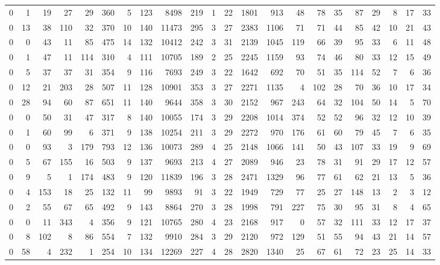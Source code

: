 {\begin{landscape}
\begin{longtable}[c]{lrrrrrrrrrrrrrrrrrrrrr}
0 & 1 & 19 & 27 & 29 & 360 & 5 & 123 & 8498 & 219 & 1 & 22 & 1801 & 913 & 48 & 78 & 35 & 87 & 29 & 8 & 17 & 33 \\
0 & 13 & 38 & 110 & 32 & 370 & 10 & 140 & 11473 & 295 & 3 & 27 & 2383 & 1106 & 71 & 71 & 44 & 85 & 42 & 10 & 21 & 43 \\
0 & 0 & 43 & 11 & 85 & 475 & 14 & 132 & 10412 & 242 & 3 & 31 & 2139 & 1045 & 119 & 66 & 39 & 95 & 33 & 6 & 11 & 48 \\
0 & 1 & 47 & 11 & 114 & 310 & 4 & 111 & 10705 & 189 & 2 & 25 & 2245 & 1159 & 93 & 74 & 46 & 80 & 33 & 12 & 15 & 49 \\
0 & 5 & 37 & 37 & 31 & 354 & 9 & 116 & 7693 & 249 & 3 & 22 & 1642 & 692 & 70 & 51 & 35 & 114 & 52 & 7 & 6 & 36 \\
0 & 12 & 21 & 203 & 28 & 507 & 11 & 128 & 10901 & 353 & 3 & 27 & 2271 & 1135 & 4 & 102 & 28 & 70 & 36 & 10 & 17 & 34 \\
0 & 28 & 94 & 60 & 87 & 651 & 11 & 140 & 9644 & 358 & 3 & 30 & 2152 & 967 & 243 & 64 & 32 & 104 & 50 & 14 & 5 & 70 \\
0 & 0 & 50 & 31 & 47 & 317 & 8 & 140 & 10055 & 174 & 3 & 29 & 2208 & 1014 & 374 & 52 & 52 & 96 & 32 & 12 & 10 & 39 \\
0 & 1 & 60 & 99 & 6 & 371 & 9 & 138 & 10254 & 211 & 3 & 29 & 2272 & 970 & 176 & 61 & 60 & 79 & 45 & 7 & 6 & 35 \\
0 & 0 & 93 & 3 & 179 & 793 & 12 & 136 & 10073 & 289 & 4 & 25 & 2148 & 1066 & 141 & 50 & 43 & 107 & 33 & 19 & 9 & 69 \\
0 & 5 & 67 & 155 & 16 & 503 & 9 & 137 & 9693 & 213 & 4 & 27 & 2089 & 946 & 23 & 78 & 31 & 91 & 29 & 17 & 12 & 57 \\
0 & 9 & 5 & 1 & 174 & 483 & 9 & 120 & 11839 & 196 & 3 & 28 & 2471 & 1329 & 96 & 77 & 61 & 62 & 21 & 13 & 5 & 36 \\
0 & 4 & 153 & 18 & 25 & 132 & 11 & 99 & 9893 & 91 & 3 & 22 & 1949 & 729 & 77 & 25 & 27 & 148 & 13 & 2 & 3 & 12 \\
0 & 2 & 55 & 67 & 65 & 492 & 9 & 143 & 8864 & 270 & 3 & 28 & 1998 & 791 & 227 & 75 & 30 & 95 & 31 & 8 & 4 & 65 \\
0 & 0 & 11 & 343 & 4 & 356 & 9 & 121 & 10765 & 280 & 4 & 23 & 2168 & 917 & 0 & 57 & 32 & 111 & 33 & 12 & 17 & 37 \\
0 & 8 & 102 & 8 & 86 & 554 & 7 & 132 & 9910 & 284 & 3 & 29 & 2120 & 972 & 129 & 51 & 55 & 94 & 43 & 21 & 14 & 57 \\
0 & 58 & 4 & 232 & 1 & 254 & 10 & 134 & 12269 & 227 & 4 & 28 & 2820 & 1340 & 25 & 67 & 61 & 72 & 23 & 25 & 14 & 33 \\

\end{longtable}
\end{landscape}}
